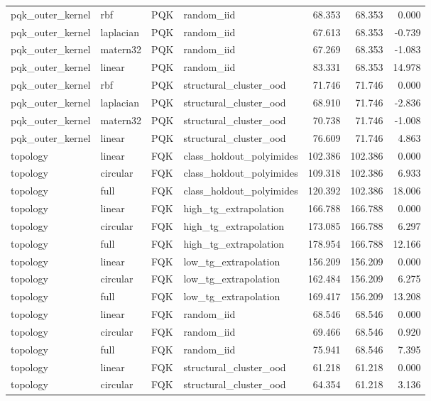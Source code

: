 \begin{tabular}{llllrrr}
pqk\_outer\_kernel & rbf & PQK & random\_iid & 68.353 & 68.353 & 0.000 \\
pqk\_outer\_kernel & laplacian & PQK & random\_iid & 67.613 & 68.353 & -0.739 \\
pqk\_outer\_kernel & matern32 & PQK & random\_iid & 67.269 & 68.353 & -1.083 \\
pqk\_outer\_kernel & linear & PQK & random\_iid & 83.331 & 68.353 & 14.978 \\
pqk\_outer\_kernel & rbf & PQK & structural\_cluster\_ood & 71.746 & 71.746 & 0.000 \\
pqk\_outer\_kernel & laplacian & PQK & structural\_cluster\_ood & 68.910 & 71.746 & -2.836 \\
pqk\_outer\_kernel & matern32 & PQK & structural\_cluster\_ood & 70.738 & 71.746 & -1.008 \\
pqk\_outer\_kernel & linear & PQK & structural\_cluster\_ood & 76.609 & 71.746 & 4.863 \\
topology & linear & FQK & class\_holdout\_polyimides & 102.386 & 102.386 & 0.000 \\
topology & circular & FQK & class\_holdout\_polyimides & 109.318 & 102.386 & 6.933 \\
topology & full & FQK & class\_holdout\_polyimides & 120.392 & 102.386 & 18.006 \\
topology & linear & FQK & high\_tg\_extrapolation & 166.788 & 166.788 & 0.000 \\
topology & circular & FQK & high\_tg\_extrapolation & 173.085 & 166.788 & 6.297 \\
topology & full & FQK & high\_tg\_extrapolation & 178.954 & 166.788 & 12.166 \\
topology & linear & FQK & low\_tg\_extrapolation & 156.209 & 156.209 & 0.000 \\
topology & circular & FQK & low\_tg\_extrapolation & 162.484 & 156.209 & 6.275 \\
topology & full & FQK & low\_tg\_extrapolation & 169.417 & 156.209 & 13.208 \\
topology & linear & FQK & random\_iid & 68.546 & 68.546 & 0.000 \\
topology & circular & FQK & random\_iid & 69.466 & 68.546 & 0.920 \\
topology & full & FQK & random\_iid & 75.941 & 68.546 & 7.395 \\
topology & linear & FQK & structural\_cluster\_ood & 61.218 & 61.218 & 0.000 \\
topology & circular & FQK & structural\_cluster\_ood & 64.354 & 61.218 & 3.136 \\

\end{tabular}
